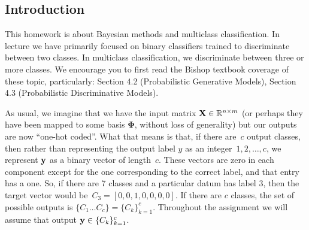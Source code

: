 \documentclass[submit]{harvardml}
\begin{document}

\subsection*{Introduction}

This homework is about Bayesian methods
and  multiclass classification. In lecture we have
primarily focused on binary classifiers trained to discriminate
between two classes. In multiclass classification, we discriminate
between three or more classes. We encourage you to first read the
Bishop textbook coverage of these topic, particularly: Section 4.2
(Probabilistic Generative Models), Section 4.3 (Probabilistic
Discriminative Models).

As usual, we imagine that we have the input matrix $\mathbf{X} \in
\mathbb{R}^{n \times m}$ (or perhaps they have been mapped to some basis
$\bm{\Phi}$, without loss of generality) but our outputs are now
``one-hot coded''.  What that means is that, if there are~$c$ output
classes, then rather than representing the output label $y$ as an
integer~${1,2,\ldots,c}$, we represent $\mathbf{y}$ as a binary vector of
length~$c$. These vectors are zero in each
component except for the one corresponding to the correct label, and
that entry has a one.  So, if there are 7 classes and a particular
datum has label 3, then the target vector would be~${C_3 = [0,0,1,0,0,0,0]}$.
If there are $c$ classes, the set of possible outputs is $\{C_1 \ldots C_c \} = \{C_k\}_{k=1}^c$.
Throughout the assignment we will assume
that output $\mathbf{y} \in \{C_k\}_{k=1}^c$.\\
\end{document}
